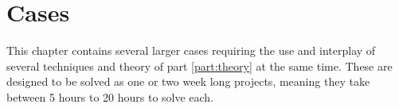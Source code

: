 \chapter{Cases} \label{chap:exercise_cases}
This chapter contains several larger cases requiring the use and interplay of several techniques and theory of part \ref{part:theory} at the same time. These are designed to be solved as one or two week long projects, meaning they take between 5 hours to 20 hours to solve each.
